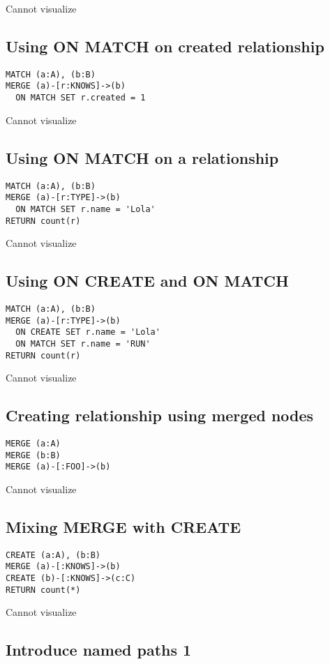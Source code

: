 Cannot visualize
\subsection{Using ON MATCH on created relationship}

\begin{lstlisting}
MATCH (a:A), (b:B)
MERGE (a)-[r:KNOWS]->(b)
  ON MATCH SET r.created = 1
\end{lstlisting}

Cannot visualize
\subsection{Using ON MATCH on a relationship}

\begin{lstlisting}
MATCH (a:A), (b:B)
MERGE (a)-[r:TYPE]->(b)
  ON MATCH SET r.name = 'Lola'
RETURN count(r)
\end{lstlisting}

Cannot visualize
\subsection{Using ON CREATE and ON MATCH}

\begin{lstlisting}
MATCH (a:A), (b:B)
MERGE (a)-[r:TYPE]->(b)
  ON CREATE SET r.name = 'Lola'
  ON MATCH SET r.name = 'RUN'
RETURN count(r)
\end{lstlisting}

Cannot visualize
\subsection{Creating relationship using merged nodes}

\begin{lstlisting}
MERGE (a:A)
MERGE (b:B)
MERGE (a)-[:FOO]->(b)
\end{lstlisting}

Cannot visualize
\subsection{Mixing MERGE with CREATE}

\begin{lstlisting}
CREATE (a:A), (b:B)
MERGE (a)-[:KNOWS]->(b)
CREATE (b)-[:KNOWS]->(c:C)
RETURN count(*)
\end{lstlisting}

Cannot visualize
\subsection{Introduce named paths 1}

